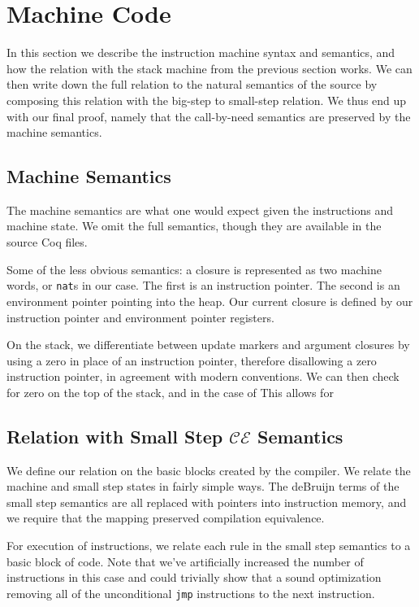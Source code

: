 \section{Machine Code}

In this section we describe the instruction machine syntax and semantics, and
how the relation with the stack machine from the previous section works. We can
then write down the full relation to the natural semantics of the source by
composing this relation with the big-step to small-step relation. We thus end
up with our final proof, namely that the call-by-need semantics are preserved
by the machine semantics. 

\subsection{Machine Semantics}

The machine semantics are what one would expect given the instructions and
machine state. We omit the full semantics, though they are available in the
source Coq files.

Some of the less obvious semantics: a closure is represented as two machine
words, or \texttt{nat}s in our case. The first is an instruction pointer. The
second is an environment pointer pointing into the heap. Our current closure is
defined by our instruction pointer and environment pointer registers. 

On the stack, we differentiate between update markers and argument closures by
using a zero in place of an instruction pointer, therefore disallowing a zero
instruction pointer, in agreement with modern conventions. We can then check for
zero on the top of the stack, and in the case of This allows for  

\subsection{Relation with Small Step $\mathcal{CE}$ Semantics}

We define our relation on the basic blocks created by the compiler. We relate
the machine and small step states in fairly simple ways. The deBruijn terms of
the small step semantics are all replaced with pointers into instruction memory,
and we require that the mapping preserved compilation equivalence. 

For execution of instructions, we relate each rule in the small step semantics
to a basic block of code. Note that we've artificially increased the number of
instructions in this case and could trivially show that a sound optimization
removing all of the unconditional \texttt{jmp} instructions to the next
instruction. 

